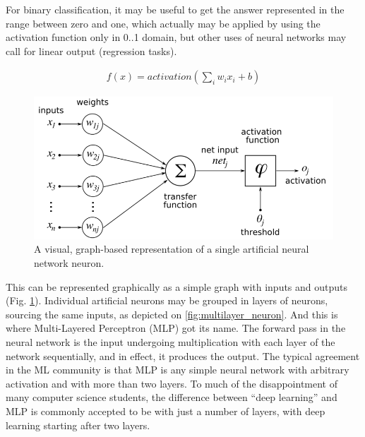 For binary classification, it may be useful to get the answer represented in the range between zero and one, which actually may be applied by using the activation function only in 0..1 domain, but other uses of neural networks may call for linear output (regression tasks).

\begin{align*}
f(x)= activation(\sum_{i} w_{i}x_{i} + b)
\end{align*}

\begin{figure}
  \centering
  \includegraphics[width=0.7\linewidth]{figures/chapter3/ArtificialNeuronModel_english.png}
  \caption[singleann]{A visual, graph-based representation of a single artificial neural network neuron\footnotemark. }
  \label{fig:single_neuron}
\end{figure}


This can be represented graphically as a simple graph with inputs and outputs (Fig. \ref{fig:single_neuron}).
Individual artificial neurons may be grouped in layers of neurons, sourcing the same inputs, as depicted on \ref{fig:multilayer_neuron}.
And this is where Multi-Layered Perceptron (MLP) got its name.
The forward pass in the neural network is the input undergoing multiplication with each layer of the network sequentially, and in effect, it produces the output.
The typical agreement in the ML community is that MLP is any simple neural network with arbitrary activation and with more than two layers.
To much of the disappointment of many computer science students, the difference between ``deep learning'' and MLP is commonly accepted to be with just a number of layers, with deep learning starting after two layers.

